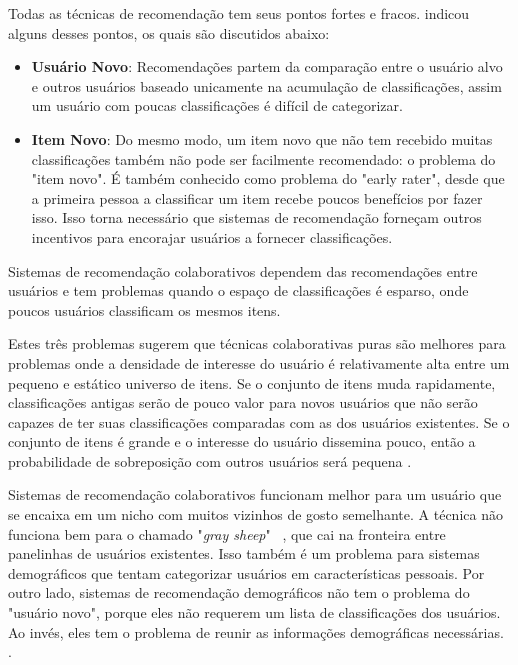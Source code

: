 Todas as técnicas de recomendação tem seus pontos fortes e fracos. \cite{Burke:2002:HRS:586321.586352} indicou alguns desses pontos, os quais são discutidos abaixo:

\begin{itemize}
	\item{\textbf{Usuário Novo}: Recomendações partem da comparação entre o usuário alvo e outros usuários baseado unicamente na acumulação de classificações, assim um usuário com poucas classificações é difícil de categorizar.}
	
	\item{\textbf{Item Novo}: Do mesmo modo, um item novo que não tem recebido muitas classificações também não pode ser facilmente recomendado: o problema do "item novo". É também conhecido como problema do "early rater", desde que a primeira pessoa a classificar um item recebe poucos benefícios por fazer isso. Isso torna necessário que sistemas de recomendação forneçam outros incentivos para encorajar usuários a fornecer classificações.}
\end{itemize}

Sistemas de recomendação colaborativos dependem das recomendações entre usuários e tem problemas quando o espaço de classificações é esparso, onde poucos usuários classificam os mesmos itens.

Estes três problemas sugerem que técnicas colaborativas puras são melhores para problemas onde a densidade de interesse do usuário é relativamente alta entre um pequeno e estático universo de itens. Se o conjunto de itens muda rapidamente, classificações antigas serão de pouco valor para novos usuários que não serão capazes de ter suas classificações comparadas com as dos usuários existentes. Se o conjunto de itens é grande e o interesse do usuário dissemina pouco, então a probabilidade de sobreposição com outros usuários será pequena \citep{Burke:2002:HRS:586321.586352}.

Sistemas de recomendação colaborativos funcionam melhor para um usuário que se encaixa em um nicho com muitos vizinhos de gosto semelhante. A técnica não funciona bem para o chamado "\textit{gray sheep}"~ \citep{claypool99}, que cai na fronteira entre panelinhas de usuários existentes. Isso também é um problema para sistemas demográficos que tentam categorizar usuários em características pessoais. Por outro lado, sistemas de recomendação demográficos não tem o problema do "usuário novo", porque eles não requerem um lista de classificações dos usuários. Ao invés, eles tem o problema de reunir as informações demográficas necessárias. \citep{Burke:2002:HRS:586321.586352}.

